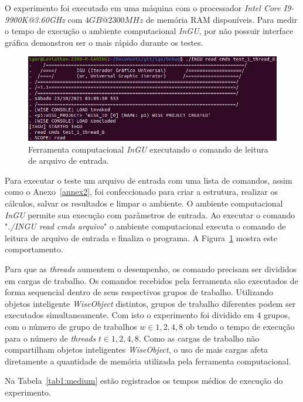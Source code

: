 O experimento foi executado em uma máquina com o processador \textit{Intel Core I9-9900K@3.60GHz} com $4GB@2300MHz$ de memória RAM disponíveis. Para medir o tempo de execução o ambiente computacional \textit{InGU}, por não possuir interface gráfica demonstrou ser o mais rápido durante os testes.


\begin{figure}[!htbp]
	\centering
	\includegraphics[width=\linewidth]{Figures/INGU.png}
	\caption{Ferramenta computacional \textit{InGU} executando o comando de leitura de arquivo de entrada.}
	\label{fig:INGU}
\end{figure}

Para executar o teste um arquivo de entrada com uma lista de comandos, assim como o Anexo~\ref{annex2}, foi confeccionado para criar a estrutura, realizar os cálculos, salvar os resultados e limpar o ambiente. O ambiente computacional \textit{InGU} permite sua execução com parâmetros de entrada. Ao executar o comando "\textit{./INGU read cmds arquivo}" o ambiente computacional executa o comando de leitura de arquivo de entrada e finaliza o programa. A Figura~\ref{fig:INGU} mostra este comportamento.

Para que as \textit{threads} aumentem o desempenho, os comando precisam ser divididos em cargas de trabalho. Os comandos recebidos pela ferramenta são executados de forma sequencial dentro de seus respectivos grupos de trabalho. Utilizando objetos inteligente \textit{WiseObject} distintos, grupos de trabalho diferentes podem ser executados simultaneamente. Com isto o experimento foi dividido em $4$ grupos, com o número de grupo de trabalhos $w \in {1,2,4,8}$ ob tendo o tempo de execução para o número de \textit{threads} $t \in {1,2,4,8}$. Como as cargas de trabalho não compartilham objetos inteligentes \textit{WiseObject}, o uso de mais cargas afeta diretamente a quantidade de memória utilizada pela ferramenta computacional.

Na Tabela~\ref{tab1:medium} estão registrados os tempos médios de execução do experimento.

